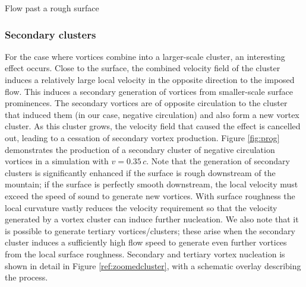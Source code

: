 \begin{chapter}{\label{cha:afm}Flow past a rough surface}
\subsubsection{Secondary clusters}
For the case where vortices combine into a larger-scale cluster, an interesting effect occurs. Close to the surface, the combined velocity field of the cluster induces a relatively large  local velocity in the opposite direction to the imposed flow.  This induces a secondary generation of vortices from smaller-scale surface prominences. The secondary vortices are of opposite circulation to the cluster that induced them (in our case, negative circulation) and also form a new vortex cluster. As this cluster grows, the velocity field that caused the effect is cancelled out, leading to a cessation of secondary vortex production. Figure \ref{fig:prog} demonstrates the production of a secondary cluster of negative circulation vortices in a simulation with $v=0.35\,c$. Note that the generation of secondary clusters is significantly enhanced if the surface is rough downstream of the mountain; if the surface is perfectly smooth downstream, the local velocity must exceed the speed of sound to generate new vortices. With surface roughness the local curvature vastly reduces the velocity requirement so that the velocity generated by a vortex cluster can induce further nucleation. We also note that it is possible to generate tertiary vortices/clusters; these arise when the secondary cluster induces a sufficiently high flow speed to generate even further vortices from the local surface roughness. Secondary and tertiary vortex nucleation is shown in detail in Figure \ref{ref:zoomedcluster}, with a schematic overlay describing the process.
\begin{figure}
  \centering
\end{figure}
\end{chapter}
